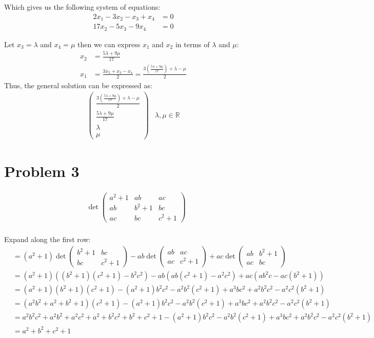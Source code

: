 \documentclass{article}
\begin{document}
Which gives us the following system of equations:
\begin{align*}
2x_1 - 3x_2 - x_3 + x_4 &= 0 \\
17x_2 - 5x_3 - 9x_4 &= 0
\end{align*}

Let \(x_3 = \lambda\) and \(x_4 = \mu\) then we can express \(x_1\) and \(x_2\) in terms of \(\lambda\) and \(\mu\):
\begin{align*}
x_2 &= \frac{5\lambda + 9\mu}{17} \\
x_1 &= \frac{3x_2 + x_3 - x_4}{2} = \frac{3\left(\frac{5\lambda + 9\mu}{17}\right) + \lambda - \mu}{2}
\end{align*}
Thus, the general solution can be expressed as:
\begin{align*}
\begin{pmatrix}
\frac{3\left(\frac{5\lambda + 9\mu}{17}\right) + \lambda - \mu}{2} \\
\frac{5\lambda + 9\mu}{17} \\
\lambda \\
\mu
\end{pmatrix} & \lambda, \mu \in \mathbb{R}
\end{align*}

\section*{Problem 3}
\begin{align*}
    & \det\begin{pmatrix}
    a^2 + 1 & ab & ac \\
    ab & b^2 + 1 & bc \\
    ac & bc & c^2 + 1
    \end{pmatrix} \\
\end{align*}

Expand along the first row:
\begin{align*}
    & = (a^2 + 1) \det\begin{pmatrix}
    b^2 + 1 & bc \\
    bc & c^2 + 1
    \end{pmatrix} - ab \det\begin{pmatrix}
    ab & ac \\
    ac & c^2 + 1
    \end{pmatrix} + ac \det\begin{pmatrix}
    ab & b^2 + 1 \\
    ac & bc
    \end{pmatrix} \\
    &= (a^2 + 1)((b^2 + 1)(c^2 + 1) - b^2c^2) - ab(ab(c^2 + 1) - a^2c^2) + ac(ab^2c - ac(b^2 + 1)) \\
    &= (a^2 + 1)(b^2 + 1)(c^2 + 1) - (a^2 + 1)b^2c^2 - a^2b^2(c^2+1) + a^3bc^2 + a^2b^2c^2 - a^2c^2(b^2 + 1) \\
    &= (a^2b^2+a^2+b^2+1)(c^2 + 1) - (a^2 + 1)b^2c^2 - a^2b^2(c^2+1) + a^3bc^2 + a^2b^2c^2 - a^2c^2(b^2 + 1) \\
    &= a^2b^2c^2 +a^2b^2+a^2c^2+a^2+b^2c^2+b^2+c^2+1 - (a^2 + 1)b^2c^2 - a^2b^2(c^2+1) + a^3bc^2 + a^2b^2c^2 - a^2c^2(b^2 + 1) \\
    &= a^2 + b^2 + c^2 + 1
\end{align*}
\end{document}
